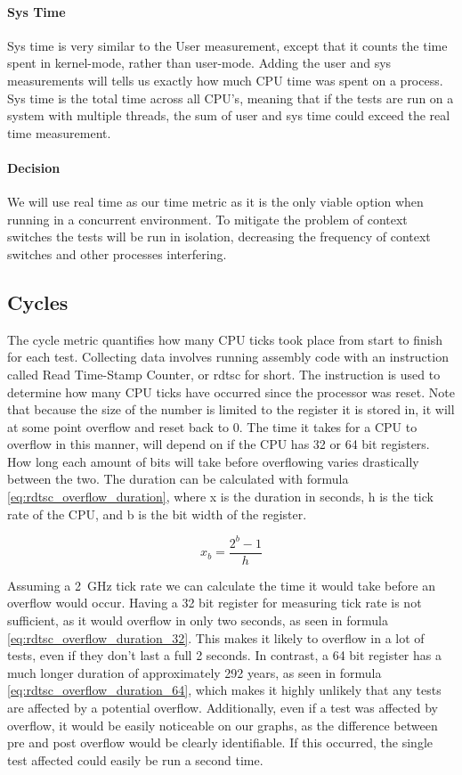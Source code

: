 \paragraph{Sys Time}
Sys time is very similar to the User measurement, except that it counts the time spent in kernel-mode, rather than user-mode.
Adding the user and sys measurements will tells us exactly how much CPU time was spent on a process.
Sys time is the total time across all CPU's, meaning that if the tests are run on a system with multiple threads, the sum of user and sys time could exceed the real time measurement.

\paragraph{Decision}
We will use real time as our time metric as it is the only viable option when running in a concurrent environment.
To mitigate the problem of context switches the tests will be run in isolation, decreasing the frequency of context switches and other processes interfering.

\subsection{Cycles}
The cycle metric quantifies how many CPU ticks took place from start to finish for each test.
Collecting data involves running assembly code with an instruction called Read Time-Stamp Counter, or rdtsc for short\cite{stack_overflow_rdtcs}.
The instruction is used to determine how many CPU ticks have occurred since the processor was reset.
Note that because the size of the number is limited to the register it is stored in, it will at some point overflow and reset back to 0.
The time it takes for a CPU to overflow in this manner, will depend on if the CPU has 32 or 64 bit registers.
How long each amount of bits will take before overflowing varies drastically between the two.
The duration can be calculated with formula \ref{eq:rdtsc_overflow_duration}, where x is the duration in seconds, h is the tick rate of the CPU, and b is the bit width of the register.

\begin{equation}\label{eq:rdtsc_overflow_duration}
x_b = \frac{2^b - 1}{h}
\end{equation}

\bigskip


\noindent
Assuming a \SI{2}{\giga\hertz} tick rate we can calculate the time it would take before an overflow would occur.
Having a 32 bit register for measuring tick rate is not sufficient, as it would overflow in only two seconds, as seen in formula \ref{eq:rdtsc_overflow_duration_32}.
This makes it likely to overflow in a lot of tests, even if they don't last a full 2 seconds.
In contrast, a 64 bit register has a much longer duration of approximately 292 years, as seen in formula \ref{eq:rdtsc_overflow_duration_64},
which makes it highly unlikely that any tests are affected by a potential overflow.
Additionally, even if a test was affected by overflow, it would be easily noticeable on our graphs,
as the difference between pre and post overflow would be clearly identifiable.
If this occurred, the single test affected could easily be run a second time.

